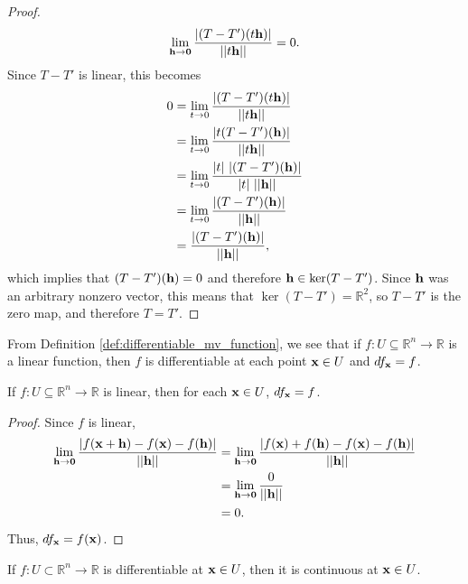 \documentclass[12pt,letterpaper,reqno]{article}
\numberwithin{equation}{section}
\newcommand{\bh}{{\bf h}}
\newcommand{\R}{\ensuremath{\mathbb R}}
\newcommand{\zv}{{\bf 0}}
\newcommand{\bx}{{\bf x}}
\begin{document}
{\begin{proof}
\begin{align*}
		\lim_{\bh \to \zv}\frac{|(T-T')(t\bh)|}{||t\bh||}=0.
	\end{align*}
Since $T-T'$ is linear, this becomes
\begin{align*}
		0&=\lim_{t \to 0}\frac{|(T-T')(t\bh)|}{||t\bh||}\\
		&=\lim_{t \to 0}\frac{|t(T-T')(\bh)|}{||t\bh||}\\
		&=\lim_{t \to 0}\frac{|t|\ |(T-T')(\bh)|}{|t| \ ||\bh||}\\
		&= \lim_{t \to 0}\frac{|(T-T')(\bh)|}{||\bh||}\\
		&=\frac{|(T-T')(\bh)|}{||\bh||},
	\end{align*}
		which implies that $(T-T')(\bh)=0$ and therefore $\bh \in \ker (T-T')$. Since $\bh$ was an arbitrary nonzero vector, this means that $\ker(T-T')=\R^2$, so $T-T'$ is the zero map, and therefore $T=T'$.
\end{proof}

From Definition \ref{def:differentiable_mv_function}, we see that if $f:U \subseteq \R^n \to \R$ is a linear function, then $f$ is differentiable at each point $\bx \in U$ and $df_\bx = f$.

\begin{prop}\label{prop:linear_f_equals_diff}
If $f:U \subseteq \R^n \to \R$ is linear, then for each $\bx \in U$, $df_\bx=f$.	
\end{prop}

\begin{proof}
		Since $f$ is linear,
	\begin{align*}
		\lim_{\bh \to {\bf 0}}\frac{|f(\bx+\bh)-f(\bx)-f(\bh)|}{||\bh||}&=\lim_{\bh \to {\bf 0}}\frac{|f(\bx)+f(\bh)-f(\bx)-f(\bh)|}{||\bh||} \\
		&=\lim_{\bh \to {\bf 0}}\frac{0}{||\bh||} \\
		&=0.
	\end{align*}
Thus, $df_\bx=f(\bx)$.
\end{proof}

\begin{thm}
	If $f:U\subset \mathbb{R}^n \to \mathbb{R}$ is differentiable at $\bx \in U$, then it is continuous at $\bx \in U$.
\end{thm}

}
\end{document}
